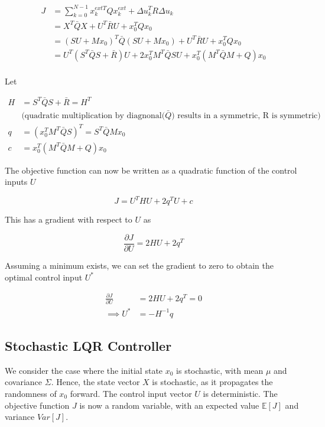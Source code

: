 \documentclass{article}
\begin{document}
\begin{equation}
  \begin{aligned}
    J &= \sum_{k=0}^{N-1} x_k^{extT} Q x^{ext}_k + \Delta u_k^T R \Delta u_k \\
    &= X^T \bar{Q} X + U^T \bar{R} U + x_0^T Q x_0 \\
    &= (S U + M x_0)^T \bar{Q} (S U + M x_0) + U^T \bar{R} U + x_0^T Q x_0 \\
    &= U^T (S^T \bar{Q} S + \bar{R}) U + 2 x_0^T M^T \bar{Q} S U + x_0^T(M^T \bar{Q} M + Q) x_0\\
  \end{aligned}
\end{equation}

Let

$$
\begin{aligned}
  H &= S^T \bar{Q} S + \bar{R} = H^T \\
  &\text{(quadratic multiplication by diagnonal($\bar{Q}$) results in a symmetric, R is symmetric)} \\
  q &= (x_0^T M^T \bar{Q} S)^T = S^T \bar{Q} M x_0 \\
  c &= x_0^T (M^T \bar{Q} M + Q) x_0
\end{aligned}
$$

The objective function can now be written as a quadratic function of the control inputs $U$

$$
J = U^T H U + 2 q^T U + c
$$

This has a gradient with respect to $U$ as

$$
\frac{\partial J}{\partial U} = 2 H U + 2 q^T
$$

Assuming a minimum exists, we can set the gradient to zero to obtain the optimal control input $U^*$

\begin{equation}
  \begin{aligned}
    \frac{\partial J}{\partial U} &= 2 H U + 2 q^T = 0 \\
    \implies U^* &= -H^{-1} q
  \end{aligned}
\end{equation}

\subsection{Stochastic LQR Controller} \label{lqr_ctrl_stoch}

We consider the case where the initial state $x_0$ is stochastic, with mean $\mu$ and covariance $\Sigma$.
Hence, the state vector $X$ is stochastic, as it propagates the randomness of $x_0$ forward.
The control input vector $U$ is deterministic. The objective function $J$ is now a random variable,
with an expected value $\mathbb{E}[J]$ and variance $Var[J]$.
\end{document}
